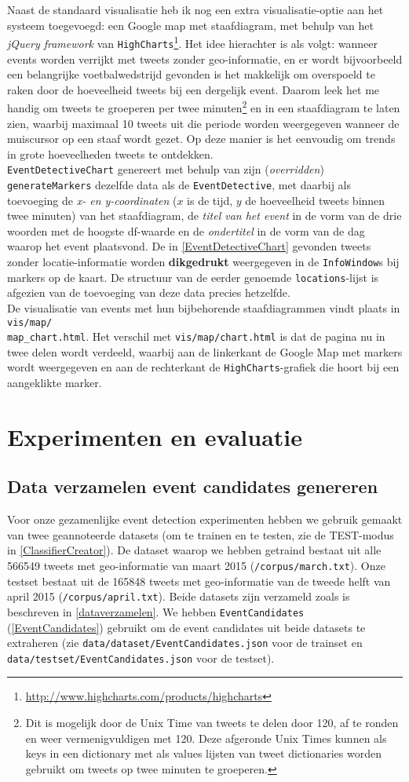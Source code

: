\documentclass[a4paper,10pt,titlepage]{article}
\def\vl{\\[9pt]}                              %
\def\s{\section}                              %
\def\ss{\subsection}                          %
\def\ttt{\texttt}                             %
\def\it{\textit}                              %
\def\bf{\textbf}                              %
\begin{document}
{{Naast de standaard visualisatie heb ik nog een extra visualisatie-optie aan het systeem 
toegevoegd: een Google map met staafdiagram, met behulp van het \it{jQuery framework} van 
\ttt{High\-Charts}\footnote{\url{http://www.highcharts.com/products/highcharts}}. 
Het idee hierachter is als volgt: wanneer events worden verrijkt 
met tweets zonder geo-informatie, en er wordt bijvoorbeeld een belangrijke 
voetbalwedstrijd gevonden is het makkelijk om overspoeld te raken door de 
hoeveelheid tweets bij een dergelijk event. Daarom leek het me handig om tweets te 
groeperen per twee minuten\footnote{Dit is mogelijk door de Unix Time van tweets 
te delen door 120, af te ronden en weer vermenigvuldigen met 120. Deze afgeronde 
Unix Times kunnen als keys in een dictionary met als values lijsten van tweet 
dictionaries worden gebruikt om tweets op twee minuten te groeperen.} en in een 
staafdiagram te laten zien, waarbij maximaal 10 tweets uit die periode worden 
weergegeven wanneer de muiscursor op een staaf wordt gezet. Op deze manier is 
het eenvoudig om trends in grote hoeveelheden tweets te ontdekken.
\vl
\ttt{EventDetectiveChart} genereert met behulp van zijn (\it{overridden}) \ttt{generateMarkers} 
dezelfde data als de \ttt{EventDetective}, met daarbij als toevoeging de \it{x- en 
y-coordinaten} ($x$ is de tijd, $y$ de hoeveelheid tweets binnen twee minuten) van 
het staafdiagram, de \it{titel van het event} in de vorm van de drie woorden met de 
hoogste df-waarde en de \it{ondertitel} in de vorm van de dag waarop het event 
plaatsvond. De in \ref{EventDetectiveChart} gevonden tweets zonder locatie-informatie worden 
\bf{dikgedrukt} weergegeven in de \ttt{InfoWindow}s bij markers op de kaart. De structuur 
van de eerder genoemde \ttt{locations}-lijst is afgezien van de toevoeging van deze 
data precies hetzelfde.
\vl
De visualisatie van events met hun bijbehorende staafdiagrammen vindt plaats in 
\ttt{vis/map/\\map\_chart.html}. Het verschil met \ttt{vis/map/chart.html} is dat de pagina nu 
in twee delen wordt verdeeld, waarbij aan de linkerkant de Google Map met 
markers wordt weergegeven en aan de rechterkant de \ttt{HighCharts}-grafiek die hoort 
bij een aangeklikte marker.

\s{Experimenten en evaluatie}

\ss{Data verzamelen event candidates genereren}

Voor onze gezamenlijke event detection experimenten hebben we gebruik gemaakt van 
twee geannoteerde datasets (om te trainen en te testen, zie de TEST-modus in \ref{ClassifierCreator}).
De dataset waarop we hebben getraind bestaat uit alle 566549 tweets met geo-informatie van
maart 2015 (\ttt{/corpus/march.txt}). Onze testset bestaat uit de 165848 tweets met geo-informatie
van de tweede helft van april 2015 (\ttt{/corpus/april.txt}). Beide datasets zijn verzameld zoals is beschreven in
\ref{dataverzamelen}. We hebben \ttt{EventCandidates} (\ref{EventCandidates}) gebruikt om de event 
candidates uit beide datasets te extraheren (zie \ttt{data/dataset/EventCandidates.json} voor de trainset en 
\ttt{data/testset/EventCandidates.json} voor de testset).

}}
\end{document}
